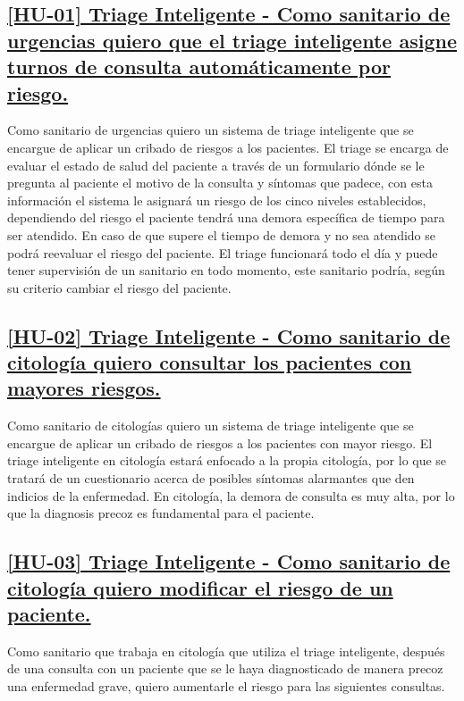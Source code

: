 \subsection*{\href{https://github.com/RubenDelgadoPareja/TFG-Triage-Inteligente-Consulta-Medica/issues/19}{[HU-01] Triage Inteligente - Como sanitario de urgencias quiero que el triage inteligente asigne turnos de consulta automáticamente por riesgo.}}
Como sanitario de urgencias quiero un sistema de triage inteligente que se encargue de aplicar un cribado de riesgos a los pacientes.
El triage se encarga de evaluar el estado de salud del paciente a través de un formulario dónde se le pregunta al paciente el motivo de la consulta y
síntomas que padece, con esta información el sistema le asignará un riesgo de los cinco niveles establecidos, dependiendo del riesgo el paciente tendrá una demora
específica de tiempo para ser atendido. En caso de que supere el tiempo de demora y no sea atendido se podrá reevaluar el riesgo del paciente.
El triage funcionará todo el día y puede tener supervisión de un sanitario en todo momento, este sanitario podría, según su criterio cambiar el riesgo del paciente.

\subsection*{\href{https://github.com/RubenDelgadoPareja/TFG-Triage-Inteligente-Consulta-Medica/issues/101}{[HU-02] Triage Inteligente - Como sanitario de citología quiero consultar los pacientes con mayores riesgos.}}
Como sanitario de citologías quiero un sistema de triage inteligente que se encargue de aplicar un cribado de riesgos a los pacientes con mayor riesgo.
El triage inteligente en citología estará enfocado a la propia citología, por lo que se tratará de un cuestionario acerca de posibles síntomas alarmantes
que den indicios de la enfermedad. En citología, la demora de consulta es muy alta, por lo que la diagnosis precoz es fundamental para el paciente.

\subsection*{\href{https://github.com/RubenDelgadoPareja/TFG-Triage-Inteligente-Consulta-Medica/issues/5}{[HU-03] Triage Inteligente - Como sanitario de citología quiero modificar el riesgo de un paciente.}}
Como sanitario que trabaja en citología que utiliza el triage inteligente, después de una consulta con un paciente que se le haya diagnosticado de manera precoz una enfermedad grave,
quiero aumentarle el riesgo para las siguientes consultas.


